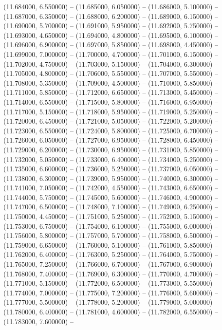 (11.684000, 6.550000) -- 
(11.685000, 6.050000) -- 
(11.686000, 5.100000) -- 
(11.687000, 6.350000) -- 
(11.688000, 6.200000) -- 
(11.689000, 6.150000) -- 
(11.690000, 5.700000) -- 
(11.691000, 5.950000) -- 
(11.692000, 5.750000) -- 
(11.693000, 4.650000) -- 
(11.694000, 4.800000) -- 
(11.695000, 6.100000) -- 
(11.696000, 6.900000) -- 
(11.697000, 5.850000) -- 
(11.698000, 4.450000) -- 
(11.699000, 7.000000) -- 
(11.700000, 4.700000) -- 
(11.701000, 6.150000) -- 
(11.702000, 4.750000) -- 
(11.703000, 5.150000) -- 
(11.704000, 6.300000) -- 
(11.705000, 4.800000) -- 
(11.706000, 5.550000) -- 
(11.707000, 5.550000) -- 
(11.708000, 5.350000) -- 
(11.709000, 4.500000) -- 
(11.710000, 5.850000) -- 
(11.711000, 5.850000) -- 
(11.712000, 6.650000) -- 
(11.713000, 5.450000) -- 
(11.714000, 6.550000) -- 
(11.715000, 5.800000) -- 
(11.716000, 6.950000) -- 
(11.717000, 5.150000) -- 
(11.718000, 5.950000) -- 
(11.719000, 5.250000) -- 
(11.720000, 6.450000) -- 
(11.721000, 5.050000) -- 
(11.722000, 5.200000) -- 
(11.723000, 6.550000) -- 
(11.724000, 5.800000) -- 
(11.725000, 6.700000) -- 
(11.726000, 6.050000) -- 
(11.727000, 6.950000) -- 
(11.728000, 6.450000) -- 
(11.729000, 6.200000) -- 
(11.730000, 6.950000) -- 
(11.731000, 5.850000) -- 
(11.732000, 5.050000) -- 
(11.733000, 6.400000) -- 
(11.734000, 5.250000) -- 
(11.735000, 6.600000) -- 
(11.736000, 5.250000) -- 
(11.737000, 6.050000) -- 
(11.738000, 6.300000) -- 
(11.739000, 5.950000) -- 
(11.740000, 6.300000) -- 
(11.741000, 7.050000) -- 
(11.742000, 4.550000) -- 
(11.743000, 6.650000) -- 
(11.744000, 5.750000) -- 
(11.745000, 5.600000) -- 
(11.746000, 4.900000) -- 
(11.747000, 6.500000) -- 
(11.748000, 7.100000) -- 
(11.749000, 6.250000) -- 
(11.750000, 4.450000) -- 
(11.751000, 5.250000) -- 
(11.752000, 5.150000) -- 
(11.753000, 6.750000) -- 
(11.754000, 6.100000) -- 
(11.755000, 6.000000) -- 
(11.756000, 5.800000) -- 
(11.757000, 5.700000) -- 
(11.758000, 6.500000) -- 
(11.759000, 6.650000) -- 
(11.760000, 5.100000) -- 
(11.761000, 5.850000) -- 
(11.762000, 6.400000) -- 
(11.763000, 5.250000) -- 
(11.764000, 5.750000) -- 
(11.765000, 7.250000) -- 
(11.766000, 6.700000) -- 
(11.767000, 6.900000) -- 
(11.768000, 7.400000) -- 
(11.769000, 6.300000) -- 
(11.770000, 4.700000) -- 
(11.771000, 5.150000) -- 
(11.772000, 6.500000) -- 
(11.773000, 5.550000) -- 
(11.774000, 7.000000) -- 
(11.775000, 7.200000) -- 
(11.776000, 5.600000) -- 
(11.777000, 5.500000) -- 
(11.778000, 5.200000) -- 
(11.779000, 5.000000) -- 
(11.780000, 6.400000) -- 
(11.781000, 4.600000) -- 
(11.782000, 6.550000) -- 
(11.783000, 7.600000) -- 
